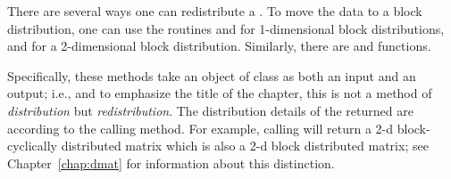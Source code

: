 There are several ways one can redistribute a .  To move the 
data to a block distribution, one can use the routines  and 
 for 1-dimensional block distributions, and 
 for a 2-dimensional block distribution.  Similarly, there are 
 and  functions.  

Specifically, these methods take an object of class 
 as both an input and an output; 
i.e., and to emphasize the title of the chapter, this is not a method of 
\emph{distribution} but \emph{redistribution}.  The distribution details of 
the returned  are according to the calling method.  For example, 
calling  will return a 2-d block-cyclically distributed matrix 
which is also a 2-d block distributed matrix; see Chapter~\ref{chap:dmat} for 
information about this distinction.

